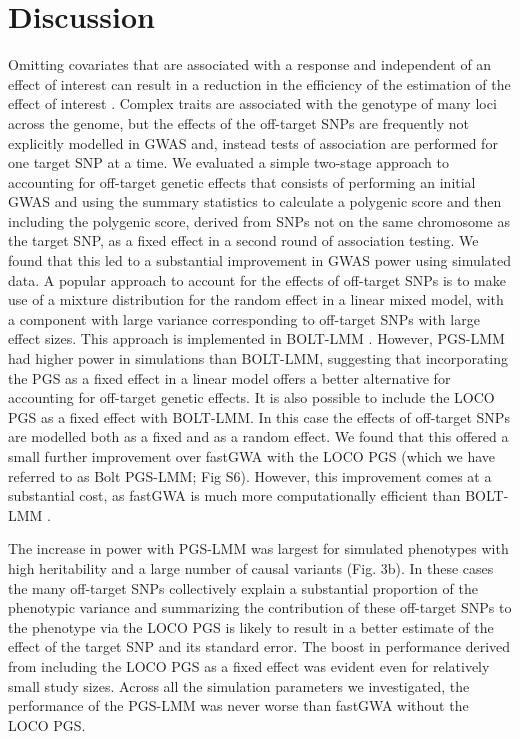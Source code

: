 \documentclass[doublespacing]{bmcart}
\begin{document}
\section*{Discussion}
Omitting covariates that are associated with a response and independent of an effect of interest can result in a reduction in the efficiency of the estimation of the effect of interest \cite{neuhaus1998estimation}. Complex traits are associated with the genotype of many loci across the genome, but the effects of the off-target SNPs are frequently not explicitly modelled in GWAS and, instead tests of association are performed for one target SNP at a time. We evaluated a simple two-stage approach to accounting for off-target genetic effects that consists of performing an initial GWAS and using the summary statistics to calculate a polygenic score and then including the polygenic score, derived from SNPs not on the same chromosome as the target SNP, as a fixed effect in a second round of association testing. We found that this led to a substantial improvement in GWAS power using simulated data. A popular approach to account for the effects of off-target SNPs is to make use of a mixture distribution for the random effect in a linear mixed model, with a component with large variance corresponding to off-target SNPs with large effect sizes. This approach is implemented in BOLT-LMM \cite{BOLT}. However, PGS-LMM had higher power in simulations than BOLT-LMM, suggesting that incorporating the PGS as a fixed effect in a linear model offers a better alternative for accounting for off-target genetic effects. It is also possible to include the LOCO PGS as a fixed effect with BOLT-LMM. In this case the effects of off-target SNPs are modelled both as a fixed and as a random effect. We found that this offered a small further improvement over fastGWA with the LOCO PGS (which we have referred to as Bolt PGS-LMM; Fig S6). However, this improvement comes at a substantial cost, as fastGWA is much more computationally efficient than BOLT-LMM \cite{jiang2019resource}. 

The increase in power with PGS-LMM was largest for simulated phenotypes with high heritability and a large number of causal variants (Fig. 3b). In these cases the many off-target SNPs collectively explain a substantial proportion of the phenotypic variance and summarizing the contribution of these off-target SNPs to the phenotype via the LOCO PGS is likely to result in a better estimate of the effect of the target SNP and its standard error. The boost in performance derived from including the LOCO PGS as a fixed effect was evident even for relatively small study sizes. Across all the simulation parameters we investigated, the performance of the PGS-LMM was never worse than fastGWA without the LOCO PGS. 
\end{document}
